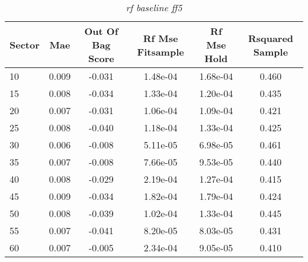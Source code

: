 \begin{table}[H]
\caption{\textit{rf baseline ff5}}\label{tab:rf_baseline_ff5}
\centering
\begin{tabular}{lccccc}
\hline\hline
Sector & Mae & Out Of Bag Score & Rf Mse Fitsample & Rf Mse Hold & Rsquared Sample \\ 
\hline
10 & 0.009 & -0.031 & 1.48e-04 & 1.68e-04 & 0.460 \\ 
15 & 0.008 & -0.034 & 1.33e-04 & 1.20e-04 & 0.435 \\ 
20 & 0.007 & -0.031 & 1.06e-04 & 1.09e-04 & 0.421 \\ 
25 & 0.008 & -0.040 & 1.18e-04 & 1.33e-04 & 0.425 \\ 
30 & 0.006 & -0.008 & 5.11e-05 & 6.98e-05 & 0.461 \\ 
35 & 0.007 & -0.008 & 7.66e-05 & 9.53e-05 & 0.440 \\ 
40 & 0.008 & -0.029 & 2.19e-04 & 1.27e-04 & 0.415 \\ 
45 & 0.009 & -0.034 & 1.82e-04 & 1.79e-04 & 0.424 \\ 
50 & 0.008 & -0.039 & 1.02e-04 & 1.33e-04 & 0.445 \\ 
55 & 0.007 & -0.041 & 8.20e-05 & 8.03e-05 & 0.431 \\ 
60 & 0.007 & -0.005 & 2.34e-04 & 9.05e-05 & 0.410 \\ 
\hline
\end{tabular}
\end{table}
